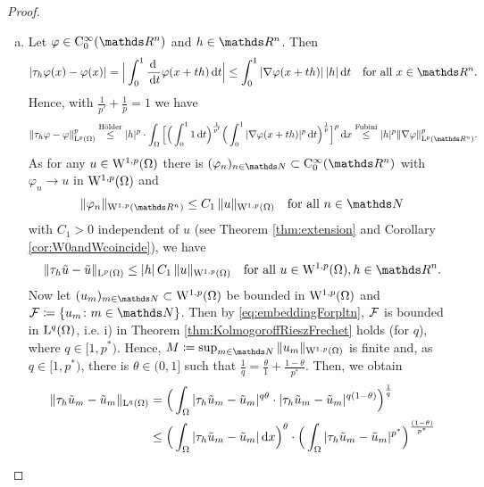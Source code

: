 \begin{proof}
  \begin{enumerate}[a)]
    \item Let $\varphi \in \CC_0^\infty(\R^n)$ and $h \in \R^n$.
      Then
      $$
      |\tau_h \varphi(x) - \varphi(x)|
      = \Big|\int_0^1 \frac{\d\ }{\d t} \varphi(x + th) \d t \Big|
      \leq \int_0^1 |\nabla\varphi(x + th)| \, |h| \d t \quad\text{for all } x \in \R^n.
      $$
      Hence, with $\frac{1}{p'} + \frac{1}{p} = 1$ we have
      $$
      \|\tau_h \varphi - \varphi \|_{\Ell^p(\Omega)}^p 
      \overset{\text{Hölder}}{\leq} |h|^p \cdot \int_\Omega \Big[ \Big( \int_0^1 1 \d t \Big)^{\frac{1}{p'}} \Big( \int_0^1 |\nabla\varphi(x + th)|^p \d t \Big)^{\frac{1}{p}} \Big]^p \d x
      \overset{\text{Fubini}}{\leq} |h|^p \|\nabla\varphi\|_{\Ell^p(\R^n)}^p.
      $$
      As for any $u \in \mathrm{W}^{1,p}(\Omega)$ there is $(\varphi_n)_{n \in \N} \subset \CC_0^\infty(\R^n)$ with $\varphi_n \to u$ in $\mathrm{W}^{1,p}(\Omega)$ and
      $$
      \|\varphi_n\|_{\WW^{1,p}(\R^n)} \leq C_1 \, \|u\|_{\WW^{1,p}(\Omega)} \quad\text{for all } n \in \N
      $$
      with $C_1 > 0$ independent of $u$ (see Theorem \ref{thm:extension} and Corollary \ref{cor:W0andWcoincide}), we have
      \begin{equation}
        \label{eq:translationEstimate}
        \|\tau_h \tilde u - \tilde u\|_{\Ell^p(\Omega)} \leq |h| \, C_1 \, \|u\|_{\WW^{1,p}(\Omega)} \quad\text{for all } u \in \WW^{1,p}(\Omega), h \in \R^n.
      \end{equation}
      Now let $(u_m)_{m \in \N} \subset \WW^{1,p}(\Omega)$ be bounded in $\mathrm{W}^{1,p}(\Omega)$ and $\FF \coloneqq \{ u_m \colon m \in \N\}$.
      Then by \eqref{eq:embeddingForpltn}, $\mathcal{F}$ is bounded in $\mathrm{L}^q(\Omega)$, i.e. i) in Theorem \ref{thm:KolmogoroffRieszFrechet} holds (for $q$), where $q \in [1,p^*)$.
        Hence, $M \coloneqq \sup_{m \in \N} \|u_m\|_{\WW^{1,p}(\Omega)}$ is finite and, as $q \in [1,p^*)$, there is $\theta \in (0,1]$ such that $\frac{1}{q} = \frac{\theta}{1} + \frac{1 - \theta}{p^*}$.
        Then, we obtain
        \begin{align*}
        \|\tau_h \tilde u_m - \tilde u_m \|_{\Ell^q(\Omega)}
        &= \Big( \int_\Omega |\tau_h \tilde u_m - \tilde u_m |^{q\theta}\cdot |\tau_h \tilde u_m - \tilde u_m |^{q(1 - \theta)} \Big)^{\frac{1}{q}} \\
        &\leq \Big( \int_\Omega |\tau_h \tilde u_m - \tilde u_m |\d x \Big)^\theta \cdot \Big( \int_\Omega |\tau_h \tilde u_m - \tilde u_m |^{p^*} \Big)^{\frac{(1 - \theta)}{p^*}}

\end{align*}
\end{enumerate}
\end{proof}
